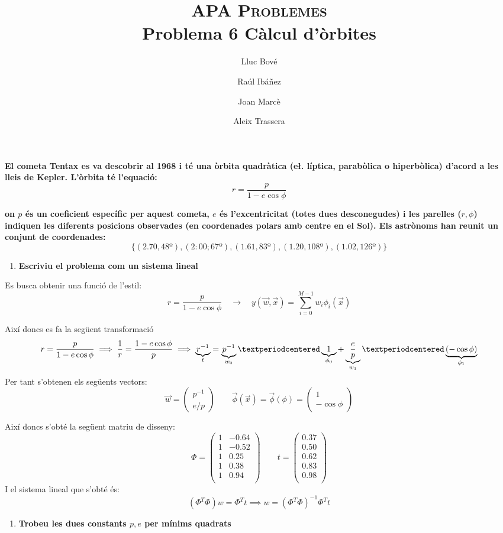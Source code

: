 \documentclass[a4paper]{article}
\title{\textsc{APA Problemes} \\ Problema 6 Càlcul d'òrbites}
\author{Lluc Bové \and Raúl Ibáñez \and Joan Marcè \and Aleix Trassera}
\date{}
\begin{document}
\maketitle

\textbf{El cometa Tentax es va descobrir al 1968 i té una òrbita quadràtica (e\l. líptica, parabòlica o hiperbòlica) d'acord a les lleis de Kepler. L'òrbita té l'equació:}
$$
r = \frac{p}{1 - e \cos \phi}
$$

\textbf{on $p$ és un coeficient específic per aquest cometa, $e$ és l'excentricitat (totes dues desconegudes) i les parelles ($r,\phi$) indiquen les diferents posicions observades (en coordenades polars amb centre en el Sol). Els astrònoms han reunit un conjunt de coordenades:}
$$
\{(2.70, 48º), (2:00; 67º), (1.61, 83º), (1.20, 108º), (1.02, 126º)\}
$$

\begin{enumerate}
	\item \textbf{Escriviu el problema com un sistema lineal}
\end{enumerate}

Es busca obtenir una funció de l'estil:
$$
r = \frac{p}{1 - e \cos\phi} \quad \longrightarrow \quad y(\vec{w}, \vec{x}) = \sum_{i=0}^{M - 1} w_i \phi_i(\vec{x})
$$

Així doncs es fa la següent transformació
$$
r = \frac{p}{1 - e \cos \phi} \implies \frac{1}{r} = \frac{1 - e \cos \phi}{p} 
\implies \underbrace{r^{-1}}_{t} = 
\underbrace{p^{-1}}_{w_0}·
\underbrace{1}_{\mathclap{\phi_0}} +
\underbrace{\frac{e}{p}}_{w_1}·\underbrace{(-\cos\phi)}_{\phi_1}
$$
Per tant s'obtenen els següents vectors:
$$
\vec{w} = 
\begin{pmatrix}
p^{-1}\\
e/p
\end{pmatrix}
\qquad
\vec{\phi}(\vec{x}) = \vec{\phi}(\phi) =
\begin{pmatrix}
1\\
- \cos \phi 
\end{pmatrix}
$$

Així doncs s'obté la següent matriu de disseny:
$$
\Phi = 
\begin{pmatrix}
1 & -0.64 \\
1 & -0.52 \\
1 & 0.25 \\
1 & 0.38 \\
1 & 0.94 \\
\end{pmatrix}
\qquad
t =
\begin{pmatrix}
0.37 \\
0.50 \\
0.62 \\
0.83 \\
0.98 \\
\end{pmatrix}
$$
I el sistema lineal que s'obté és:
$$
(\Phi^T\Phi)w = \Phi^T t \implies w = (\Phi^T\Phi)^{-1} \Phi^T t 
$$
\begin{enumerate}[resume]
	\item \textbf{Trobeu les dues constants $p,e$ per mínims quadrats}
\end{enumerate}
\end{document}
